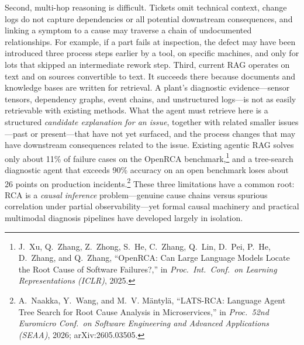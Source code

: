 \documentclass[12pt]{article}
\begin{document}
Second, multi-hop reasoning is difficult. Tickets omit technical context, change logs do not capture dependencies or all potential downstream consequences, and linking a symptom to a cause may traverse a chain of undocumented relationships. For example, if a part fails at inspection, the defect may have been introduced three process steps earlier by a tool, on specific machines, and only for lots that skipped an intermediate rework step. Third, current RAG operates on text and on sources convertible to text. It succeeds there because documents and knowledge bases are written for retrieval. A plant's diagnostic evidence---sensor tensors, dependency graphs, event chains, and unstructured logs---is not as easily retrievable with existing methods. What the agent must retrieve here is a structured \emph{candidate explanation for an issue}, together with related smaller issues---past or present---that have not yet surfaced, and the process changes that may have downstream consequences related to the issue. Existing agentic RAG solves only about 11\% of failure cases on the OpenRCA benchmark,\footnote{J.~Xu, Q.~Zhang, Z.~Zhong, S.~He, C.~Zhang, Q.~Lin, D.~Pei, P.~He, D.~Zhang, and Q.~Zhang, ``OpenRCA: Can Large Language Models Locate the Root Cause of Software Failures?,'' in \emph{Proc.\ Int.\ Conf.\ on Learning Representations (ICLR)}, 2025.} and a tree-search diagnostic agent that exceeds 90\% accuracy on an open benchmark loses about 26 points on production incidents.\footnote{A.~Naakka, Y.~Wang, and M.~V. M\"{a}ntyl\"{a}, ``LATS-RCA: Language Agent Tree Search for Root Cause Analysis in Microservices,'' in \emph{Proc.\ 52nd Euromicro Conf.\ on Software Engineering and Advanced Applications (SEAA)}, 2026; arXiv:2605.03505.} These three limitations have a common root: RCA is a \emph{causal inference} problem---genuine cause chains versus spurious correlation under partial observability---yet formal causal machinery and practical multimodal diagnosis pipelines have developed largely in isolation.
\end{document}
